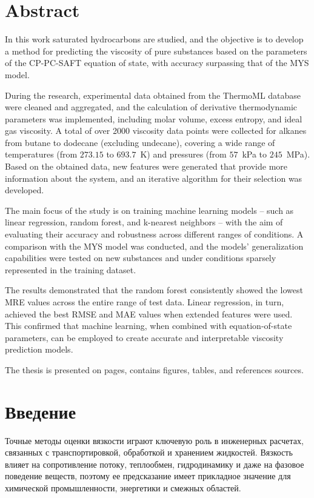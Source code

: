 \documentclass[a4paper,12pt]{article}
\begin{document}
\section*{Abstract}
  In this work saturated hydrocarbons are studied, and the objective is to develop a method for predicting the viscosity of pure substances based on the parameters of the CP-PC-SAFT equation of state, with accuracy surpassing that of the MYS model.

  During the research, experimental data obtained from the ThermoML database were cleaned and aggregated, and the calculation of derivative thermodynamic parameters was implemented, including molar volume, excess entropy, and ideal gas viscosity.
  A total of over 2000 viscosity data points were collected for alkanes from butane to dodecane (excluding undecane), covering a wide range of temperatures (from $273.15$ to $693.7$~K) and pressures (from $57$~kPa to $245$~MPa).
  Based on the obtained data, new features were generated that provide more information about the system, and an iterative algorithm for their selection was developed.

  The main focus of the study is on training machine learning models -- such as linear regression, random forest, and k-nearest neighbors -- with the aim of evaluating their accuracy and robustness across different ranges of conditions. A comparison with the MYS model was conducted, and the models' generalization capabilities were tested on new substances and under conditions sparsely represented in the training dataset.

  The results demonstrated that the random forest consistently showed the lowest MRE values across the entire range of test data. Linear regression, in turn, achieved the best RMSE and MAE values when extended features were used. This confirmed that machine learning, when combined with equation-of-state parameters, can be employed to create accurate and interpretable viscosity prediction models.

  The thesis is presented on \pageref{LastPage} pages, contains  figures,  tables, and references  sources.

\newpage

\tableofcontents
\newpage

\section*{Введение}
  Точные методы оценки вязкости играют ключевую роль в инженерных расчетах, связанных с транспортировкой, обработкой и хранением жидкостей. Вязкость влияет на сопротивление потоку, теплообмен, гидродинамику и даже на фазовое поведение веществ, поэтому ее предсказание имеет прикладное значение для химической промышленности, энергетики и смежных областей.
  
\end{document}
